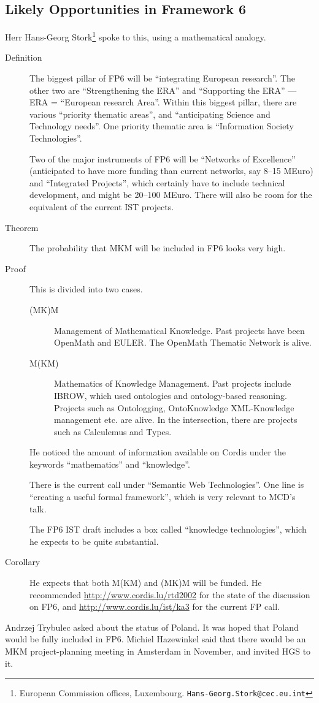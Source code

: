 \documentclass[11pt, a4paper]{article}
\begin{document}
\subsection{Likely Opportunities in Framework 6}
Herr Hans-Georg Stork\footnote{European Commission offices, Luxembourg.
\tt Hans-Georg.Stork@cec.eu.int} spoke to this, using a mathematical analogy.
\begin{description}
\item[Definition]The biggest pillar of FP6 will be ``integrating European
research''. The other two are ``Strengthening the ERA'' and ``Supporting
the ERA'' --- ERA = ``European research Area''. Within this biggest pillar,
there are various ``priority thematic areas'', and ``anticipating Science
and Technology needs''. One priority thematic area is ``Information Society
Technologies''.
\item[]Two of the major instruments of FP6 will be ``Networks of
Excellence'' (anticipated to have more funding than current networks, say
8--15 MEuro) and ``Integrated Projects'', which certainly have to include
technical development, and might be 20--100 MEuro. There will also be room
for the equivalent of the current IST projects.
\item[Theorem]The probability that MKM will be included in FP6 looks very
high.
\item[Proof]This is divided into two cases.
\begin{description}
\item[(MK)M]Management of Mathematical Knowledge. Past projects have been
OpenMath and EULER. The OpenMath Thematic Network is alive.
\item[M(KM)]Mathematics of Knowledge Management. Past projects 
include IBROW, which used ontologies and ontology-based reasoning. Projects
such as Ontologging, OntoKnowledge XML-Knowledge management etc. are alive.
In the intersection, there are projects such as Calculemus and Types.
\end{description}
He noticed the amount of information available on Cordis under the keywords
``mathematics'' and ``knowledge''.
\item[]There is the current call under ``Semantic Web Technologies''. One
line is ``creating a useful formal framework'', which is very relevant to
MCD's talk. 
\item[]The FP6 IST draft includes a box called ``knowledge technologies'',
which he expects to be quite substantial.
\item[Corollary]He expects that both M(KM) and (MK)M will be funded. He
recommended \url{http://www.cordis.lu/rtd2002} for the state of the
discussion on FP6, and \url{http://www.cordis.lu/ist/ka3} for the current
FP call.
\end{description}
Andrzej Trybulec asked about the status of Poland. It was hoped that
Poland would be fully included in FP6.
Michiel Hazewinkel said that there would be an MKM project-planning meeting
in Amsterdam in November, and invited HGS to it.
\end{document}
